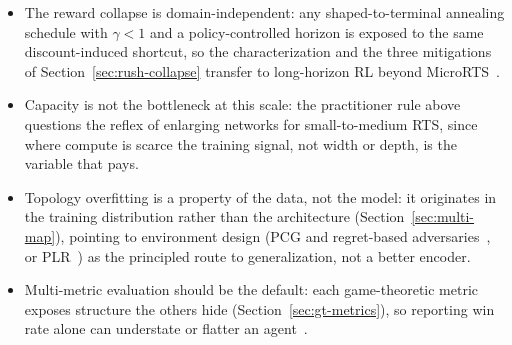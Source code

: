 \begin{itemize}\itemsep2pt
  \item The reward collapse is domain-independent: any shaped-to-terminal annealing schedule with $\gamma<1$ and a policy-controlled horizon is exposed to the same discount-induced shortcut, so the characterization and the three mitigations of Section~\ref{sec:rush-collapse} transfer to long-horizon RL beyond MicroRTS~\cite{ngPolicyInvarianceReward1999}.
  \item Capacity is not the bottleneck at this scale: the practitioner rule above questions the reflex of enlarging networks for small-to-medium RTS, since where compute is scarce the training signal, not width or depth, is the variable that pays.
  \item Topology overfitting is a property of the data, not the model: it originates in the training distribution rather than the architecture (Section~\ref{sec:multi-map}), pointing to environment design (PCG and regret-based adversaries~\cite{dennisEmergentComplexityZeroshot2021, wangPairedOpenEndedTrailblazer2019}, or PLR~\cite{jiangPrioritizedLevelReplay2021}) as the principled route to generalization, not a better encoder.
  \item Multi-metric evaluation should be the default: each game-theoretic metric exposes structure the others hide (Section~\ref{sec:gt-metrics}), so reporting win rate alone can understate or flatter an agent~\cite{balduzziReevaluatingEvaluation2018, omidshafieiARankMultiAgentEvaluation2019}.
\end{itemize}